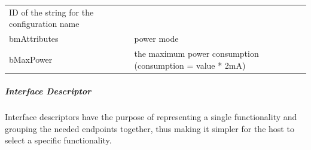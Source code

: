 \begin{longtable}[]{@{}ll@{}}
\begin{minipage}[t]{0.47\columnwidth}
{ID of the string for the configuration name}
\strut\end{minipage}\tabularnewline
\begin{minipage}[t]{0.47\columnwidth}\raggedright\strut
{bmAttributes}
\strut\end{minipage} &
\begin{minipage}[t]{0.47\columnwidth}\raggedright\strut
{power mode}
\strut\end{minipage}\tabularnewline
\begin{minipage}[t]{0.47\columnwidth}\raggedright\strut
{bMaxPower}
\strut\end{minipage} &
\begin{minipage}[t]{0.47\columnwidth}\raggedright\strut
{the maximum power consumption (consumption = value * 2mA)}
\strut\end{minipage}\tabularnewline
\bottomrule
\end{longtable}

\hypertarget{h.6og933fa49b9}{\subparagraph{\texorpdfstring{{Interface
Descriptor}}{Interface Descriptor}}\label{h.6og933fa49b9}}

{Interface descriptors have the purpose of representing a single
functionality and grouping the needed endpoints together, thus making it
simpler for the host to select a specific functionality.}

\href{}{}\href{}{}

